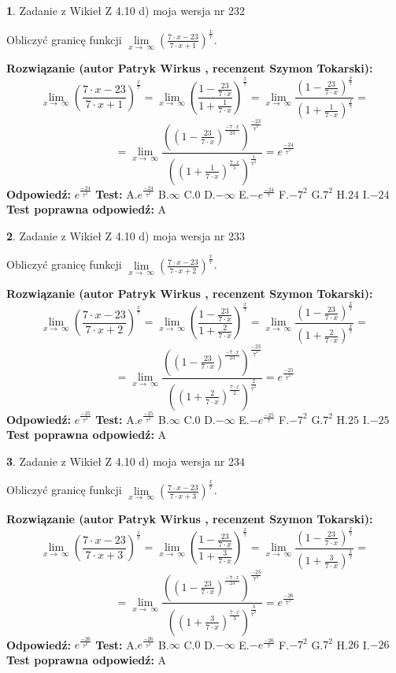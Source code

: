 \documentclass[12pt, a4paper]{article}
\theoremstyle{definition} %
\newtheorem{zad}{}
\newcommand{\zadStart}[1]{\begin{zad}#1\newline}
\newcommand{\zadStop}{\end{zad}}
\newcommand{\rozwStart}[2]{\noindent \textbf{Rozwiązanie (autor #1 , recenzent #2): }\newline}
\newcommand{\rozwStop}{\newline}
\newcommand{\odpStart}{\noindent \textbf{Odpowiedź:}\newline}
\newcommand{\odpStop}{\newline}
\newcommand{\testStart}{\noindent \textbf{Test:}\newline}
\newcommand{\testStop}{\newline}
\newcommand{\kluczStart}{\noindent \textbf{Test poprawna odpowiedź:}\newline}
\newcommand{\kluczStop}{\newline}
\begin{document}
\zadStart{Zadanie z Wikieł Z 4.10 d) moja wersja nr 232}


Obliczyć granicę funkcji  $\lim\limits_{x\to\ \infty}(\frac{7\cdot x-23}{7\cdot x+1})^{\frac{x}{7}}$.
\zadStop
\rozwStart{Patryk Wirkus}{Szymon Tokarski}
$$\lim\limits_{x\to\ \infty}(\frac{7\cdot x-23}{7\cdot x+1})^{\frac{x}{7}} = \lim\limits_{x\to\ \infty}(\frac{1-\frac{23}{7\cdot x}}{1+\frac{1}{7\cdot x}})^{\frac{x}{7}}=\lim\limits_{x\to\ \infty}\frac{(1-\frac{23}{7\cdot x})^{\frac{x}{7}}}{(1+\frac{1}{7\cdot x})^{\frac{x}{7}}}=$$
$$=\lim\limits_{x\to\ \infty}\frac{((1-\frac{23}{7\cdot x})^{\frac{-7\cdot x}{23}})^{\frac{-23}{7^{2}}}}{((1+\frac{1}{7\cdot x})^{\frac{7\cdot x}{1}})^{\frac{1}{7^{2}}}}=e^{\frac{-24}{7^{2}}}$$
\rozwStop
\odpStart
$e^{\frac{-24}{7^{2}}}$
\odpStop
\testStart
A.$e^{\frac{-24}{7^{2}}}$ B.$\infty$ C.$0$ D.$-\infty$ E.$-e^{\frac{-24}{7}}$
F.$-7^{2}$ G.$7^{2}$
H.$24$
I.$-24$
\testStop
\kluczStart
A
\kluczStop



\zadStart{Zadanie z Wikieł Z 4.10 d) moja wersja nr 233}


Obliczyć granicę funkcji  $\lim\limits_{x\to\ \infty}(\frac{7\cdot x-23}{7\cdot x+2})^{\frac{x}{7}}$.
\zadStop
\rozwStart{Patryk Wirkus}{Szymon Tokarski}
$$\lim\limits_{x\to\ \infty}(\frac{7\cdot x-23}{7\cdot x+2})^{\frac{x}{7}} = \lim\limits_{x\to\ \infty}(\frac{1-\frac{23}{7\cdot x}}{1+\frac{2}{7\cdot x}})^{\frac{x}{7}}=\lim\limits_{x\to\ \infty}\frac{(1-\frac{23}{7\cdot x})^{\frac{x}{7}}}{(1+\frac{2}{7\cdot x})^{\frac{x}{7}}}=$$
$$=\lim\limits_{x\to\ \infty}\frac{((1-\frac{23}{7\cdot x})^{\frac{-7\cdot x}{23}})^{\frac{-23}{7^{2}}}}{((1+\frac{2}{7\cdot x})^{\frac{7\cdot x}{2}})^{\frac{2}{7^{2}}}}=e^{\frac{-25}{7^{2}}}$$
\rozwStop
\odpStart
$e^{\frac{-25}{7^{2}}}$
\odpStop
\testStart
A.$e^{\frac{-25}{7^{2}}}$ B.$\infty$ C.$0$ D.$-\infty$ E.$-e^{\frac{-25}{7}}$
F.$-7^{2}$ G.$7^{2}$
H.$25$
I.$-25$
\testStop
\kluczStart
A
\kluczStop



\zadStart{Zadanie z Wikieł Z 4.10 d) moja wersja nr 234}


Obliczyć granicę funkcji  $\lim\limits_{x\to\ \infty}(\frac{7\cdot x-23}{7\cdot x+3})^{\frac{x}{7}}$.
\zadStop
\rozwStart{Patryk Wirkus}{Szymon Tokarski}
$$\lim\limits_{x\to\ \infty}(\frac{7\cdot x-23}{7\cdot x+3})^{\frac{x}{7}} = \lim\limits_{x\to\ \infty}(\frac{1-\frac{23}{7\cdot x}}{1+\frac{3}{7\cdot x}})^{\frac{x}{7}}=\lim\limits_{x\to\ \infty}\frac{(1-\frac{23}{7\cdot x})^{\frac{x}{7}}}{(1+\frac{3}{7\cdot x})^{\frac{x}{7}}}=$$
$$=\lim\limits_{x\to\ \infty}\frac{((1-\frac{23}{7\cdot x})^{\frac{-7\cdot x}{23}})^{\frac{-23}{7^{2}}}}{((1+\frac{3}{7\cdot x})^{\frac{7\cdot x}{3}})^{\frac{3}{7^{2}}}}=e^{\frac{-26}{7^{2}}}$$
\rozwStop
\odpStart
$e^{\frac{-26}{7^{2}}}$
\odpStop
\testStart
A.$e^{\frac{-26}{7^{2}}}$ B.$\infty$ C.$0$ D.$-\infty$ E.$-e^{\frac{-26}{7}}$
F.$-7^{2}$ G.$7^{2}$
H.$26$
I.$-26$
\testStop
\kluczStart
A
\kluczStop
\end{document}
